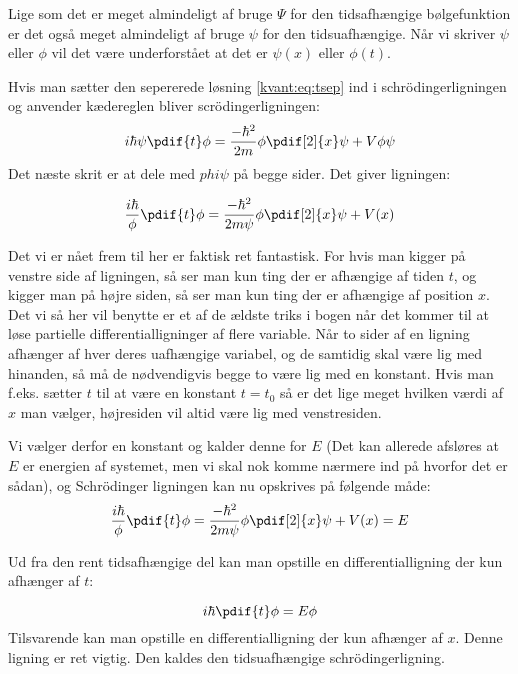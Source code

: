 Lige som det er meget almindeligt af bruge $\Psi$ for den tidsafhængige bølgefunktion er det også meget almindeligt af bruge $\psi$ for den tidsuafhængige. Når vi skriver $\psi$ eller $\phi$ vil det være underforstået at det er $\psi(x)$ eller $\phi(t)$.

Hvis man sætter den sepererede løsning \eqref{kvant:eq:tsep} ind i schrödingerligningen og anvender kædereglen bliver scrödingerligningen:
\begin{equation}
i\hbar \psi \pdif{t}\phi = \frac{-\hbar^2}{2m}\phi\pdif[2]{x}\psi+V\phi\psi
\end{equation}
Det næste skrit er at dele med $phi\psi$ på begge sider. Det giver ligningen:

\begin{equation}
\frac{i\hbar}{\phi} \pdif{t}\phi = \frac{-\hbar^2}{2m\psi}\phi\pdif[2]{x}\psi+V(x)
\end{equation}

Det vi er nået frem til her er faktisk ret fantastisk. For hvis man kigger på venstre side af ligningen, så ser man kun ting der er afhængige af tiden $t$, og kigger man på højre siden, så ser man kun ting der er afhængige af position $x$. Det vi så her vil benytte er et af de ældste triks i bogen når det kommer til at løse partielle differentialligninger af flere variable. Når to sider af en ligning afhænger af hver deres uafhængige variabel, og de samtidig skal være lig med hinanden, så må de nødvendigvis begge to være lig med en konstant. Hvis man f.eks. sætter $t$ til at være en konstant $t=t_0$ så er det lige meget hvilken værdi af $x$ man vælger, højresiden vil altid være lig med venstresiden.

Vi vælger derfor en konstant og kalder denne for $E$ (Det kan allerede afsløres at $E$ er energien af systemet, men vi skal nok komme nærmere ind på hvorfor det er sådan), og Schrödinger ligningen kan nu opskrives på følgende måde:
\begin{equation}
\frac{i\hbar}{\phi} \pdif{t}\phi = \frac{-\hbar^2}{2m\psi}\phi\pdif[2]{x}\psi+V(x) = E
\end{equation}

Ud fra den rent tidsafhængige del kan man opstille en differentialligning der kun afhænger af $t$:

\begin{equation}
i\hbar\pdif{t}\phi = E\phi
\end{equation}
Tilsvarende kan man opstille en differentialligning der kun afhænger af $x$. Denne ligning er ret vigtig. Den kaldes den tidsuafhængige schrödingerligning.

